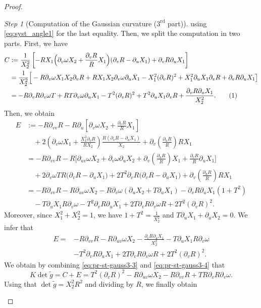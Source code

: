 \documentclass{article}
\newcommand{\DUV}{\partial_{uv}}
\newcommand{\DVV}{\partial_{vv}}
\newcommand{\DU}{\partial_{u}}
\newcommand{\DV}{\partial_{v}}
\theoremstyle{remark}
\theoremstyle{prpart}
\newtheorem{proofpart}{Step}
\newcommand{\snum}{\addtocounter{equation}{1}\tag{\theequation}}
\begin{document}
\begin{proof}
\begin{proofpart}[Computation of the Gaussian curvature ($3^{\text{rd}}$ part)]
\normalsize
using \eqref{eq:syst_angle1} for the last equality. Then, we split the computation in two parts. First, we have
\begin{align*}
C &:= \frac{1}{X_2^2}\left[-RX_1\Big(\DV\omega X_2+\frac{\DV R}{R}X_1\Big)(\DV R-\DU X_{1})+\DV R\DU X_{1}\right]\\
  &= \frac{1}{X_2^2}\Big[-R\DV\omega X_1X_2\DV R+RX_1X_2\DV\omega \DU X_{1}-X_1^2(\DV R)^2+X_1^2\DU X_{1}\DV R+\DV R\DU X_{1}\big]\\
  &=-R\DV R\DV\omega T + RT\DV\omega\DU X_{1}-T^2(\DV R)^2+T^2\DU X_{1}\DV R+\frac{\DV R\DU X_{1}}{X_2^2}.\snum\label{eq:pr-st-gauss3-3}
\end{align*}
Then, we obtain
\begin{align*}
  E &:= -R\DVV R- R\DU\left[\DV\omega X_2+\frac{\DV R}{R}X_1\right]\\
  &\quad+ 2\left(\DV\omega X_1+\frac{X_1^2\DV R}{RX_2}\right)\frac{R(\DV R-\DU X_{1})}{X_2}+\DV\left(\frac{\DU R}{R}\right)RX_1\\
    &=-R\DVV R-R\Big[\DUV\omega X_2 + \DV\omega\DU X_{2}+\DV\left(\frac{\DU R}{R}\right)X_1+\frac{\DV R}{R}\DU X_{1}\Big] \\
  &\quad+ 2\DV\omega TR\big(\DV R-\DU X_{1}\big)+2T^2\DV R\big(\DV R-\DU X_{1}\big) + \DV\left(\frac{\DU R}{R}\right)RX_{1}\\
    &= -R\DVV R-R\DUV\omega X_2 - R\DV\omega(\DU X_{2}+T\DU X_{1}) - \DV R \DU X_{1}(1+T^2) \\
  &\quad-T\DU X_{1}R\DV\omega-T^2\DV R\DU X_{1}+2T\DV R\DV\omega R+2T^2(\DV R)^2.
\end{align*}
Moreover, since $X_1^2+X_2^2 = 1$, we have $1+T^2 = \frac{1}{X_2^2}$ and $T\DU X_{1}+\DU X_{2} = 0$. We infer that
\begin{equation}\label{eq:pr-st-gauss3-4}
  \begin{split}
    E =& -R\DVV R-R\DUV\omega X_2 - \frac{\DV R\DU X_{1}}{X_2^2}-T\DU X_{1}R\DV\omega\\&-T^2\DV R\DU X_{1}+2T\DV R\DV\omega R+2T^2(\DV R)^2.
    \end{split}
\end{equation}
We obtain by combining \eqref{eq:pr-st-gauss3-3} and \eqref{eq:pr-st-gauss3-4} that
\begin{equation}\label{eq:pr-st-gauss3-5}
  K\det \tilde g = C+E= T^2(\DV R)^2-R\DUV\omega X_2  -R\DVV R+TR\DV R \DV\omega.
\end{equation}
Using that $\det \tilde g=X_2^2R^2$ and dividing by $R$, we finally obtain
\begin{equation}

\end{equation}
\end{proofpart}
\end{proof}
\end{document}
